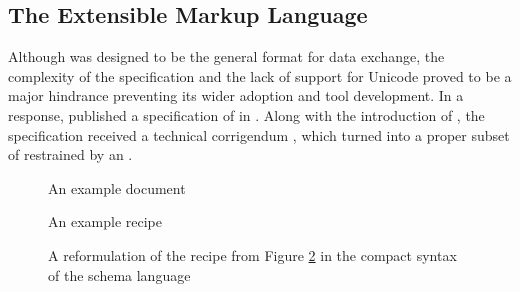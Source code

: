 \subsection{The Extensible Markup Language}
Although  was designed to be the general format for data exchange,
the complexity of the specification and the lack of support for Unicode proved
to be a major hindrance preventing its wider adoption and tool development. In a
response,  published a specification of  in
\citeyear{bray98}. Along with the introduction of , the
 specification received a technical corrigendum
\cite{goldfarb97:webSGML}, which turned  into a proper subset of
 restrained by an  .

\begin{figure}
  \caption{An example  document}
  \label{fig:recipe}\bigskip
\end{figure}

\begin{figure}
  \caption{An example recipe }
  \label{fig:recipe-dtd}
\end{figure}
        
\begin{figure}
  \caption{A reformulation of the recipe  from Figure
    \ref{fig:recipe-dtd} in the compact syntax of the 
    schema language}
  \label{fig:recipe-rnc}
\end{figure}

